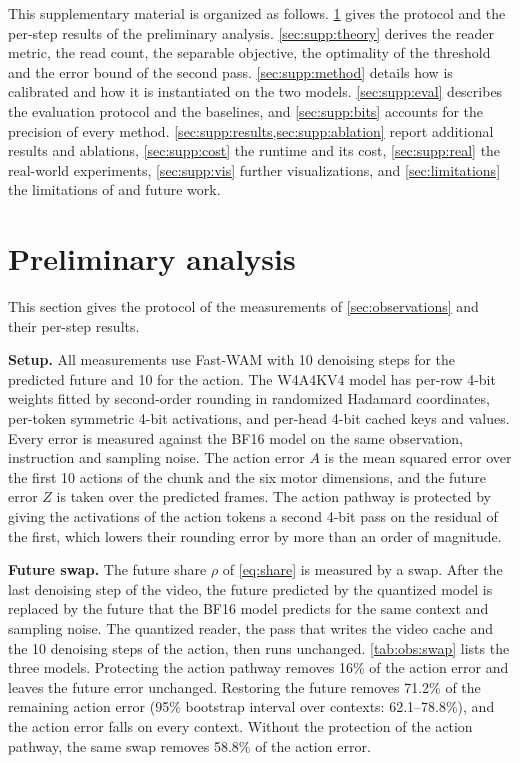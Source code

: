 \clearpage
\setcounter{page}{1}
\maketitlesupplementary

\setcounter{section}{0}
\renewcommand{\thesection}{\Alph{section}}
\renewcommand{\theHsection}{supp.\Alph{section}}

This supplementary material is organized as follows.
\cref{sec:supp:prelim} gives the protocol and the per-step results of the preliminary analysis.
\cref{sec:supp:theory} derives the reader metric, the read count, the separable objective, the optimality of the threshold and the error bound of the second pass.
\cref{sec:supp:method} details how \method is calibrated and how it is instantiated on the two models.
\cref{sec:supp:eval} describes the evaluation protocol and the baselines, and \cref{sec:supp:bits} accounts for the precision of every method.
\cref{sec:supp:results,sec:supp:ablation} report additional results and ablations, \cref{sec:supp:cost} the runtime and its cost, \cref{sec:supp:real} the real-world experiments, \cref{sec:supp:vis} further visualizations, and \cref{sec:limitations} the limitations of \method and future work.

\section{Preliminary analysis}
\label{sec:supp:prelim}
This section gives the protocol of the measurements of \cref{sec:observations} and their per-step results.

\noindent\textbf{Setup.}
All measurements use Fast-WAM with 10 denoising steps for the predicted future and 10 for the action. 
The W4A4KV4 model has per-row 4-bit weights fitted by second-order rounding in randomized Hadamard coordinates, per-token symmetric 4-bit activations, and per-head 4-bit cached keys and values.
Every error is measured against the BF16 model on the same observation, instruction and sampling noise.
The action error $A$ is the mean squared error over the first 10 actions of the chunk and the six motor dimensions, and the future error $Z$ is taken over the predicted frames.
The action pathway is protected by giving the activations of the action tokens a second 4-bit pass on the residual of the first, which lowers their rounding error by more than an order of magnitude.

\noindent\textbf{Future swap.}
The future share $\rho$ of \cref{eq:share} is measured by a swap.
After the last denoising step of the video, the future predicted by the quantized model is replaced by the future that the BF16 model predicts for the same context and sampling noise.
The quantized reader, \ie the pass that writes the video cache and the 10 denoising steps of the action, then runs unchanged.
\cref{tab:obs:swap} lists the three models.
Protecting the action pathway removes 16\% of the action error and leaves the future error unchanged.
Restoring the future removes 71.2\% of the remaining action error (95\% bootstrap interval over contexts: 62.1--78.8\%), and the action error falls on every context.
Without the protection of the action pathway, the same swap removes 58.8\% of the action error.

